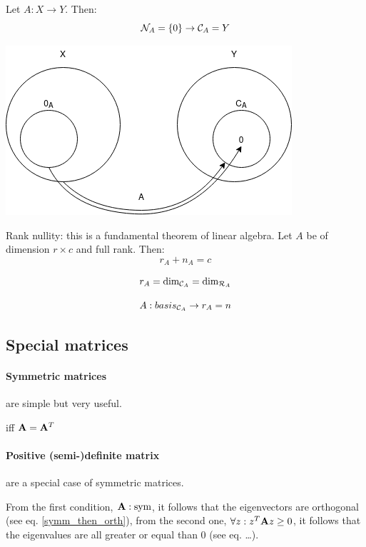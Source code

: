 \begin{theorem}
    Let $A: X \to Y$. Then:
    $$ \mathcal{N}_{A} = \{ 0 \} \to \mathcal{C}_{A} = Y $$
\end{theorem}

\includegraphics[width=0.4\linewidth]{images/A_from_X_to_Y.png}

\begin{theorem}
    Rank nullity: this is a fundamental theorem of linear algebra.
    Let $A$ be of dimension $r \times c$ and full rank.
    Then: 
    $$ r_A + n_A = c $$
\end{theorem}


\begin{theorem}
    $$ r_A = \text{dim}_{\mathcal{C}_{A}} = \text{dim}_{\mathcal{R}_{A}} $$
\end{theorem}

\begin{theorem}
    $$ A:basis_{\mathcal{C}_{A}} \to r_A = n $$
\end{theorem}






\subsection{Special matrices}

\paragraph{Symmetric matrices} are simple but very useful.
\begin{definition}
     iff $\mathbf{A} = \mathbf{A}^T$
\end{definition}


\paragraph{Positive (semi-)definite matrix} are a special case of symmetric matrices.
\begin{definition}
    From the first condition, $\mathbf{A}: \text{sym}$, it follows that the eigenvectors are orthogonal (see eq. \ref{symm_then_orth}), 
    from the second one, $\forall z: z^T \mathbf{A} z \geq 0$, it follows that the eigenvalues are all greater or equal than $0$ (see eq. \dots).
\end{definition}


